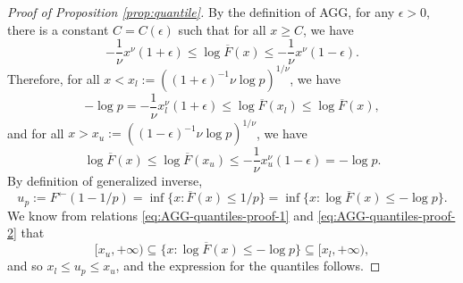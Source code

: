 % 
\begin{proof}[Proof of Proposition \ref{prop:quantile}]
By the definition of AGG, for any $\epsilon>0$, there is a constant $C=C(\epsilon)$ such that for all $x\ge C$, we have
$$
-\frac{1}{\nu}x^\nu(1+\epsilon) \le \log{\overline{F}(x)} \le -\frac{1}{\nu}x^\nu(1-\epsilon).
$$
Therefore, for all $x < x_l := \left((1+\epsilon)^{-1}\nu\log{p}\right)^{1/\nu}$, we have
\begin{equation} \label{eq:AGG-quantiles-proof-1}
    -\log{p} = -\frac{1}{\nu}x_l^\nu(1+\epsilon) \le \log{\overline{F}(x_l)} \le \log{\overline{F}(x)},
\end{equation}
and for all $x > x_u := \left((1-\epsilon)^{-1}\nu\log{p}\right)^{1/\nu}$, we have
\begin{equation} \label{eq:AGG-quantiles-proof-2}
    \log{\overline{F}(x)} \le \log{\overline{F}(x_u)} \le -\frac{1}{\nu}x_u^\nu(1-\epsilon) = -\log{p}.
\end{equation}
By definition of generalized inverse,
\begin{equation*}
    u_p := F^\leftarrow(1-1/p) = \inf\{x:\overline{F}(x)\le 1/p\} = \inf\{x:\log{\overline{F}(x)} \le -\log{p}\}.
\end{equation*}
We know from relations \eqref{eq:AGG-quantiles-proof-1} and \eqref{eq:AGG-quantiles-proof-2} that 
$$
[x_u, +\infty) \subseteq \{x:\log{\overline{F}(x)} \le -\log{p}\} \subseteq [x_l, +\infty),
$$
and so $x_l\le u_p \le x_u$, and the expression for the quantiles follows.
\end{proof}

